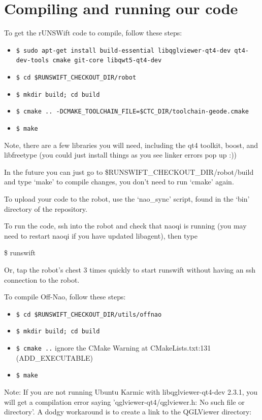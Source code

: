 \documentclass[pdftex,11pt,a4paper]{report}
\begin{document}
\section{Compiling and running our code}

To get the rUNSWift code to compile, follow these steps: 

\begin{itemize}
  \item{\texttt{\$ sudo apt-get install build-essential libqglviewer-qt4-dev qt4-dev-tools cmake git-core libqwt5-qt4-dev}}
  \item{\texttt{\$ cd \$RUNSWIFT\_CHECKOUT\_DIR/robot}}
  \item{\texttt{\$ mkdir build; cd build}}
  \item{\texttt{\$ cmake .. -DCMAKE\_TOOLCHAIN\_FILE=\$CTC\_DIR/toolchain-geode.cmake}}
  \item{\texttt{\$ make}}
\end{itemize}

Note, there are a few libraries you will need, including the qt4 toolkit, boost, and libfreetype (you could just install things as you see linker errors pop up :)) 

In the future you can just go to \$RUNSWIFT\_CHECKOUT\_DIR/robot/build and type `make' to compile changes, you don't need to run `cmake' again. 

To upload your code to the robot, use the `nao\_sync' script, found in the `bin' directory of the repository. 

To run the code, ssh into the robot and check that naoqi is running (you may need to restart naoqi if you have updated libagent), then type 

\$ runswift 

Or, tap the robot's chest 3 times quickly to start runswift without having an ssh connection to the robot.

To compile Off-Nao, follow these steps: 

\begin{itemize}
\item{\texttt{\$ cd \$RUNSWIFT\_CHECKOUT\_DIR/utils/offnao}}
\item{\texttt{\$ mkdir build; cd build}}
\item{\texttt{\$ cmake ..} ignore the CMake Warning at CMakeLists.txt:131 (ADD\_EXECUTABLE)}
\item{\texttt{\$ make}}
\end{itemize}

Note: If you are not running Ubuntu Karmic with libqglviewer-qt4-dev 2.3.1, you will get a compilation error saying 'qglviewer-qt4/qglviewer.h: No such file or directory'. A dodgy workaround is to create a link to the QGLViewer directory: 
\end{document}
